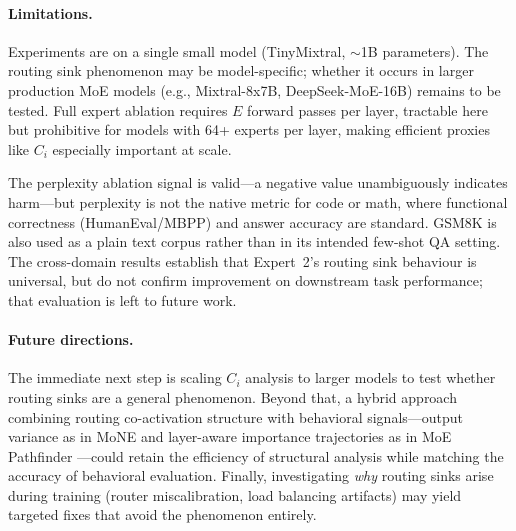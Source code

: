 \documentclass{article}
\begin{document}
\paragraph{Limitations.}
Experiments are on a single small model (TinyMixtral, $\sim$1B parameters). The routing sink phenomenon may be model-specific; whether it occurs in larger production MoE models (e.g., Mixtral-8x7B, DeepSeek-MoE-16B) remains to be tested. Full expert ablation requires $E$ forward passes per layer, tractable here but prohibitive for models with 64+ experts per layer, making efficient proxies like $C_i$ especially important at scale.

The perplexity ablation signal is valid---a negative value unambiguously indicates harm---but perplexity is not the native metric for code or math, where functional correctness (HumanEval/MBPP) and answer accuracy are standard. GSM8K is also used as a plain text corpus rather than in its intended few-shot QA setting. The cross-domain results establish that Expert~2's routing sink behaviour is universal, but do not confirm improvement on downstream task performance; that evaluation is left to future work.

\paragraph{Future directions.}
The immediate next step is scaling $C_i$ analysis to larger models to test whether routing sinks are a general phenomenon. Beyond that, a hybrid approach combining routing co-activation structure with behavioral signals---output variance as in MoNE \citep{zhang2025mone} and layer-aware importance trajectories as in MoE Pathfinder \citep{yang2025pathfinder}---could retain the efficiency of structural analysis while matching the accuracy of behavioral evaluation. Finally, investigating \emph{why} routing sinks arise during training (router miscalibration, load balancing artifacts) may yield targeted fixes that avoid the phenomenon entirely.



\end{document}

